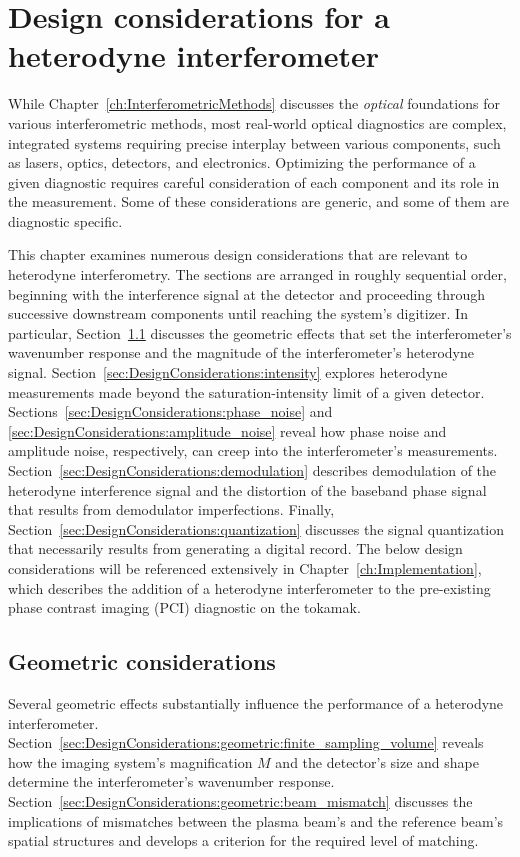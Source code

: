 \chapter{Design considerations for a heterodyne interferometer}
\label{ch:DesignConsiderations}
While Chapter~\ref{ch:InterferometricMethods} discusses the
\emph{optical} foundations for various interferometric methods,
most real-world optical diagnostics are complex, integrated systems
requiring precise interplay between various components, such as
lasers, optics, detectors, and electronics.
Optimizing the performance of a given diagnostic
requires careful consideration
of each component and its role in the measurement.
Some of these considerations are generic, and
some of them are diagnostic specific.

This chapter examines numerous design considerations
that are relevant to heterodyne interferometry.
The sections are arranged in roughly sequential order,
beginning with the interference signal at the detector and
proceeding through successive downstream components
until reaching the system's digitizer.
In particular, Section~\ref{sec:DesignConsiderations:geometric}
discusses the geometric effects that
set the interferometer's wavenumber response and
the magnitude of the interferometer's heterodyne signal.
Section~\ref{sec:DesignConsiderations:intensity}
explores heterodyne measurements made
beyond the saturation-intensity limit of a given detector.
Sections~\ref{sec:DesignConsiderations:phase_noise} and
\ref{sec:DesignConsiderations:amplitude_noise}
reveal how phase noise and amplitude noise, respectively,
can creep into the interferometer's measurements.
Section~\ref{sec:DesignConsiderations:demodulation}
describes demodulation of the heterodyne interference signal and
the distortion of the baseband phase signal
that results from demodulator imperfections.
Finally, Section~\ref{sec:DesignConsiderations:quantization}
discusses the signal quantization
that necessarily results
from generating a digital record.
The below design considerations will be referenced extensively in
Chapter~\ref{ch:Implementation}, which
describes the addition of a heterodyne interferometer
to the pre-existing phase contrast imaging (PCI) diagnostic
on the \diiid\space tokamak.


\section{Geometric considerations}
\label{sec:DesignConsiderations:geometric}
Several geometric effects substantially influence
the performance of a heterodyne interferometer.
Section~\ref{sec:DesignConsiderations:geometric:finite_sampling_volume}
reveals how the imaging system's magnification $M$ and
the detector's size and shape
determine the interferometer's wavenumber response.
Section~\ref{sec:DesignConsiderations:geometric:beam_mismatch}
discusses the implications of mismatches between
the plasma beam's and the reference beam's spatial structures and
develops a criterion for the required level of matching.


